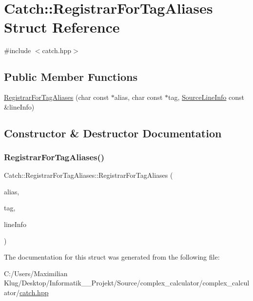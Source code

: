 \hypertarget{struct_catch_1_1_registrar_for_tag_aliases}{}\section{Catch\+:\+:Registrar\+For\+Tag\+Aliases Struct Reference}
\label{struct_catch_1_1_registrar_for_tag_aliases}


{\ttfamily \#include $<$catch.\+hpp$>$}

\subsection*{Public Member Functions}
\begin{DoxyCompactItemize}
\item 
\mbox{\hyperlink{struct_catch_1_1_registrar_for_tag_aliases_ae4e45830e4763bcd65d55d8db9167b69}{Registrar\+For\+Tag\+Aliases}} (char const $\ast$alias, char const $\ast$tag, \mbox{\hyperlink{struct_catch_1_1_source_line_info}{Source\+Line\+Info}} const \&line\+Info)
\end{DoxyCompactItemize}


\subsection{Constructor \& Destructor Documentation}
\mbox{\label{struct_catch_1_1_registrar_for_tag_aliases_ae4e45830e4763bcd65d55d8db9167b69}} 
\subsubsection{\texorpdfstring{Registrar\+For\+Tag\+Aliases()}{RegistrarForTagAliases()}}
{\footnotesize\ttfamily Catch\+::\+Registrar\+For\+Tag\+Aliases\+::\+Registrar\+For\+Tag\+Aliases (\begin{DoxyParamCaption}\item[{char const $\ast$}]{alias,  }\item[{char const $\ast$}]{tag,  }\item[{\mbox{\hyperlink{struct_catch_1_1_source_line_info}{Source\+Line\+Info}} const \&}]{line\+Info }\end{DoxyParamCaption})}



The documentation for this struct was generated from the following file\+:\begin{DoxyCompactItemize}
\item 
C\+:/\+Users/\+Maximilian Klug/\+Desktop/\+Informatik\+\_\+\_\+\+Projekt/\+Source/complex\+\_\+calculator/complex\+\_\+calculator/\mbox{\hyperlink{catch_8hpp}{catch.\+hpp}}\end{DoxyCompactItemize}
